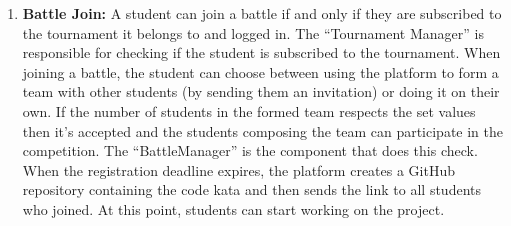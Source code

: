 \begin{enumerate}
   \newpage
   
   \item \textbf{Battle Join:}
   A student can join a battle if and only if they are subscribed to the tournament it belongs to and logged in. The “Tournament Manager” is responsible for checking if the student is subscribed to the tournament. When joining a battle, the student can choose between using the platform to form a team with other students (by sending them an invitation) or doing it on their own. If the number of students in the formed team respects the set values then it’s accepted and the students composing the team can participate in the competition. The “BattleManager” is the component that does this check. When the registration deadline expires, the platform creates a GitHub repository containing the code kata and then sends the link to all students who joined. At this point, students can start working on the project.
   

\end{enumerate}
